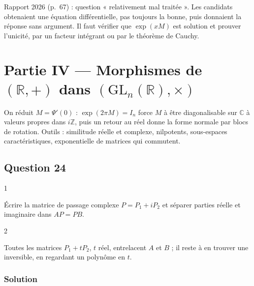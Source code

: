 \documentclass[11pt,a4paper]{article}
\begin{document}
\begin{jury}

Rapport 2026 (p.~67) : question « relativement mal traitée ». Les candidats obtenaient une équation différentielle, pas toujours la bonne, puis donnaient la réponse sans argument. Il faut vérifier que \(\exp(xM)\) est solution et prouver l'unicité, par un facteur intégrant ou par le théorème de Cauchy.

\end{jury}

\hypertarget{partie-iv-morphismes-de-mathbbr-dans-mathrmgl_nmathbbrtimes}{%
\section{\texorpdfstring{Partie IV --- Morphismes de \((\mathbb{R},+)\) dans \(({\mathrm{GL}}_n(\mathbb{R}),\times)\)}{Partie IV --- Morphismes de (\textbackslash mathbb\{R\},+) dans (\{\textbackslash mathrm\{GL\}\}\_n(\textbackslash mathbb\{R\}),\textbackslash times)}}\label{partie-iv-morphismes-de-mathbbr-dans-mathrmgl_nmathbbrtimes}}

On réduit \(M=\Psi'(0)\) : \(\exp(2\pi M)=I_n\) force \(M\) à être diagonalisable sur \(\mathbb{C}\) à valeurs propres dans \(i\mathbb{Z}\), puis un retour au réel donne la forme normale par blocs de rotation. Outils : similitude réelle et complexe, nilpotents, sous-espaces caractéristiques, exponentielle de matrices qui commutent.

\hypertarget{question-24}{%
\subsection{Question 24}\label{question-24}}

\begin{indication}{1}

Écrire la matrice de passage complexe \(P=P_1+iP_2\) et séparer parties réelle et imaginaire dans \(AP=PB\).

\end{indication}

\begin{indication}{2}

Toutes les matrices \(P_1+tP_2\), \(t\) réel, entrelacent \(A\) et \(B\) ; il reste à en trouver une inversible, en regardant un polynôme en \(t\).

\end{indication}

\hypertarget{solution-23}{%
\subsubsection{Solution}\label{solution-23}}
\end{document}
